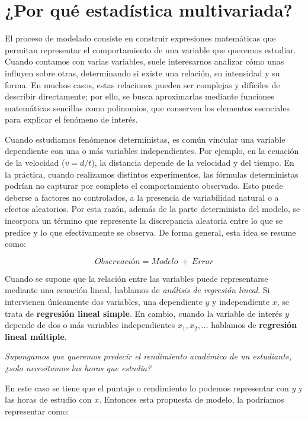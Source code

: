 \documentclass[
]{book}
\begin{document}
\section{¿Por qué estadística multivariada?}\label{por-quuxe9-estaduxedstica-multivariada}

El proceso de modelado consiste en construir expresiones matemáticas que permitan representar el comportamiento de una variable que queremos estudiar. Cuando contamos con varias variables, suele interesarnos analizar cómo unas influyen sobre otras, determinando si existe una relación, su intensidad y su forma. En muchos casos, estas relaciones pueden ser complejas y difíciles de describir directamente; por ello, se busca aproximarlas mediante funciones matemáticas sencillas como polinomios, que conserven los elementos esenciales para explicar el fenómeno de interés.

Cuando estudiamos fenómenos deterministas, es común vincular una variable dependiente con una o más variables independientes. Por ejemplo, en la ecuación de la velocidad (\(v=d/t\)), la distancia depende de la velocidad y del tiempo. En la práctica, cuando realizamos distintos experimentos, las fórmulas deterministas podrían no capturar por completo el comportamiento observado. Esto puede deberse a factores no controlados, a la presencia de variabilidad natural o a efectos aleatorios. Por esta razón, además de la parte determinista del modelo, se incorpora un término que represente la discrepancia aleatoria entre lo que se predice y lo que efectivamente se observa. De forma general, esta idea se resume como:

\[Observación = Modelo \ + \ Error\]

Cuando se supone que la relación entre las variables puede representarse mediante una ecuación lineal, hablamos de \emph{análisis de regresión lineal}. Si intervienen únicamente dos variables, una dependiente \(y\) y independiente \(x\), se trata de \textbf{regresión lineal simple}. En cambio, cuando la variable de interés \(y\) depende de dos o más variables independientes \(x_1,x_2, ...\) hablamos de \textbf{regresión lineal múltiple}.

\emph{Supongamos que queremos predecir el rendimiento académico de un estudiante, ¿solo necesitamos las horas que estudia?}

En este caso se tiene que el puntaje o rendimiento lo podemos representar con \(y\) y las horas de estudio con \(x\). Entonces esta propuesta de modelo, la podríamos representar como:
\end{document}
